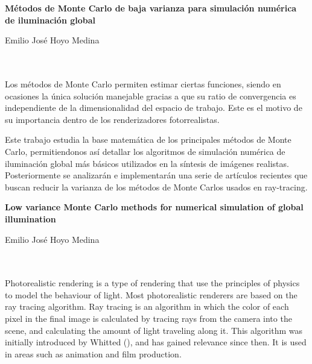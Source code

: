 
\cleardoublepage
\thispagestyle{empty}

\begin{center}
{\large\bfseries Métodos de Monte Carlo de baja varianza para simulación numérica de iluminación global}\\
\end{center}
\begin{center}
Emilio José Hoyo Medina\\
\end{center}

\\

\vspace{0.7cm}
\\

Los métodos de Monte Carlo permiten estimar ciertas funciones, siendo en ocasiones la única solución manejable gracias a que su ratio de convergencia es independiente de la dimensionalidad del espacio de trabajo. Este es el motivo de su importancia dentro de los renderizadores fotorrealistas.


Este trabajo estudia la base matemática de los principales métodos de Monte Carlo, permitiendonos así detallar los algoritmos de simulación numérica de iluminación global más básicos utilizados en la síntesis de imágenes realistas. Posteriormente se analizarán e implementarán una serie de artículos recientes que buscan reducir la varianza de los métodos de Monte Carlos usados en ray-tracing.

\cleardoublepage


\thispagestyle{empty}


\begin{center}
{\large\bfseries Low variance Monte Carlo methods for numerical simulation of global illumination}\\
\end{center}
\begin{center}
Emilio José Hoyo Medina\\
\end{center}

\\

\vspace{0.7cm}
\\
Photorealistic rendering is a type of rendering that use the principles of physics to model the behaviour of light. Most photorealistic renderers are based on the ray tracing algorithm. Ray tracing is an algorithm in which the color of each pixel in the final image is calculated by tracing rays from the camera into the scene, and calculating the amount of light traveling along it.  This algorithm was initially introduced by Whitted (\cite{Whitted}), and has gained relevance since then. It is used in areas such as animation and film production.

